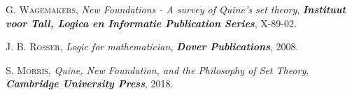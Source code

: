 \documentclass[bsl,meeting]{asl}
\begin{document}
\begin{thebibliography}{10}

{\scshape G. Wagemakers},
{\itshape New Foundations - A survey of Quine's set theory},
{\bfseries\itshape Instituut voor Tall, Logica en Informatie Publication Series},
X-89-02.

{\scshape J. B. Rosser},
{\itshape Logic for mathematician},
{\bfseries\itshape Dover Publications},
2008.

{\scshape S. Morris},
{\itshape Quine, New Foundation, and the Philosophy of Set Theory},
{\bfseries\itshape Cambridge University Press},
2018.

\end{thebibliography}


\vspace*{-0.5\baselineskip}
\end{document}
